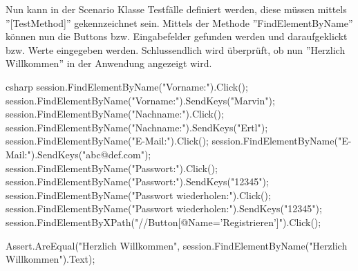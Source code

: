 Nun kann in der Scenario Klasse Testfälle definiert werden, diese müssen mittels ''[TestMethod]'' gekennzeichnet sein. Mittels der Methode ''FindElementByName'' können nun die Buttons bzw. Eingabefelder gefunden werden und daraufgeklickt bzw. Werte eingegeben werden. Schlussendlich wird überprüft, ob nun ''Herzlich Willkommen'' in der Anwendung angezeigt wird.

\begin{code}{csharp}
	session.FindElementByName("Vorname:").Click();
	session.FindElementByName("Vorname:").SendKeys("Marvin");
	session.FindElementByName("Nachname:").Click();
	session.FindElementByName("Nachname:").SendKeys("Ertl");
	session.FindElementByName("E-Mail:").Click();
	session.FindElementByName("E-Mail:").SendKeys("abc@def.com");
	session.FindElementByName("Passwort:").Click();
	session.FindElementByName("Passwort:").SendKeys("12345");
	session.FindElementByName("Passwort wiederholen:").Click();
	session.FindElementByName("Passwort wiederholen:").SendKeys("12345");
	session.FindElementByXPath("//Button[@Name='Registrieren']").Click();
	
	Assert.AreEqual("Herzlich Willkommen", session.FindElementByName("Herzlich Willkommen").Text);
\end{code}

